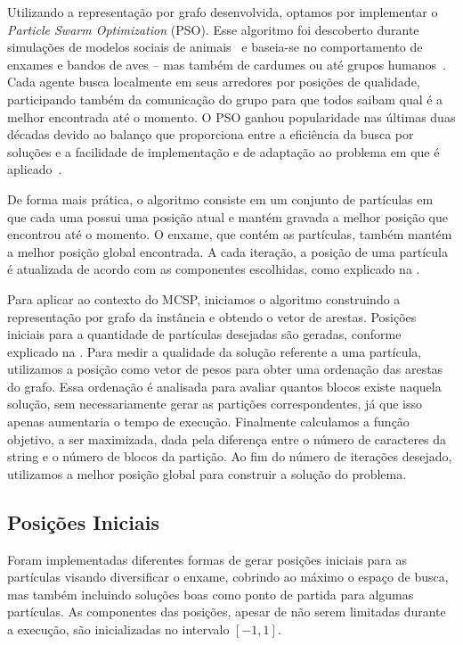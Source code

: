 Utilizando a representação por grafo desenvolvida, optamos por implementar o \textit{Particle Swarm Optimization} (PSO). Esse algoritmo foi descoberto durante simulações de modelos sociais de animais~\cite{kennedy_particle_1995} e baseia-se no comportamento de enxames e bandos de aves -- mas também de cardumes ou até grupos humanos~\cite[p.~7]{yang_nature-inspired_2010}. Cada agente busca localmente em seus arredores por posições de qualidade, participando também da comunicação do grupo para que todos saibam qual é a melhor encontrada até o momento. O PSO ganhou popularidade nas últimas duas décadas devido ao balanço que proporciona entre a eficiência da busca por soluções e a facilidade de implementação e de adaptação ao problema em que é aplicado~\cite[p.~640]{marti_handbook_2018}.

De forma mais prática, o algoritmo consiste em um conjunto de partículas em que cada uma possui uma posição atual e mantém gravada a melhor posição que encontrou até o momento. O enxame, que contém as partículas, também mantém a melhor posição global encontrada. A cada iteração, a posição de uma partícula é atualizada de acordo com as componentes escolhidas, como explicado na .

Para aplicar ao contexto do MCSP, iniciamos o algoritmo construindo a representação por grafo da instância e obtendo o vetor de arestas. Posições iniciais para a quantidade de partículas desejadas são geradas, conforme explicado na . Para medir a qualidade da solução referente a uma partícula, utilizamos a posição como vetor de pesos para obter uma ordenação das arestas do grafo. Essa ordenação é analisada para avaliar quantos blocos existe naquela solução, sem necessariamente gerar as partições correspondentes, já que isso apenas aumentaria o tempo de execução. Finalmente calculamos a função objetivo, a ser maximizada, dada pela diferença entre o número de caracteres da string e o número de blocos da partição. Ao fim do número de iterações desejado, utilizamos a melhor posição global para construir a solução do problema.

\subsection{Posições Iniciais} \label{sec:posicoes}

    Foram implementadas diferentes formas de gerar posições iniciais para as partículas visando diversificar o enxame, cobrindo ao máximo o espaço de busca, mas também incluindo soluções boas como ponto de partida para algumas partículas. As componentes das posições, apesar de não serem limitadas durante a execução, são inicializadas no intervalo $[-1,1]$.

